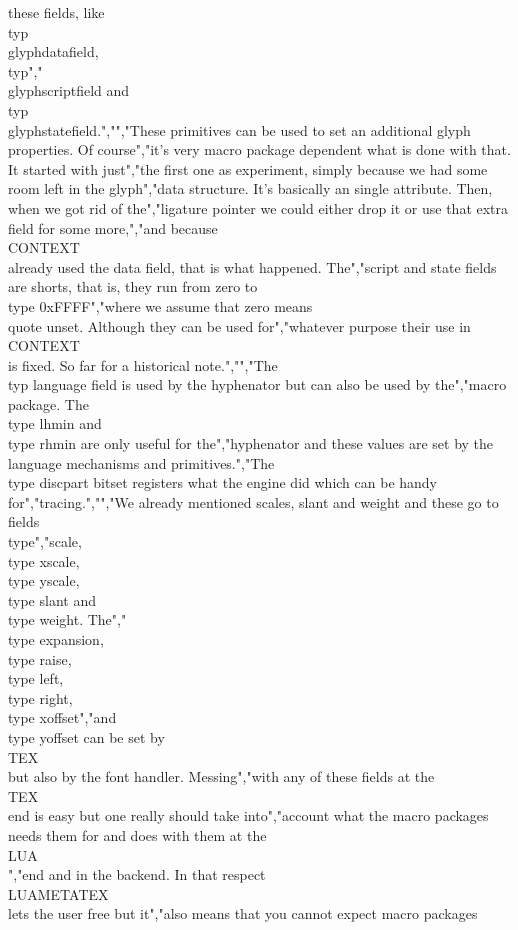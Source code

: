 these fields, like \\typ {\\glyphdatafield}, \\typ","{\\glyphscriptfield} and \\typ {\\glyphstatefield}.","","These primitives can be used to set an additional glyph properties. Of course","it's very macro package dependent what is done with that. It started with just","the first one as experiment, simply because we had some room left in the glyph","data structure. It's basically an single attribute. Then, when we got rid of the","ligature pointer we could either drop it or use that extra field for some more,","and because \\CONTEXT\\ already used the data field, that is what happened. The","script and state fields are shorts, that is, they run from zero to \\type {0xFFFF}","where we assume that zero means \\quote {unset}. Although they can be used for","whatever purpose their use in \\CONTEXT\\ is fixed. So far for a historical note.","","The \\typ {language} field is used by the hyphenator but can also be used by the","macro package. The \\type {lhmin} and \\type {rhmin} are only useful for the","hyphenator and these values are set by the language mechanisms and primitives.","The \\type {discpart} bitset registers what the engine did which can be handy for","tracing.","","We already mentioned scales, slant and weight and these go to fields \\type","{scale}, \\type {xscale}, \\type {yscale}, \\type {slant} and \\type {weight}. The","\\type {expansion}, \\type {raise}, \\type {left}, \\type {right}, \\type {xoffset}","and \\type {yoffset} can be set by \\TEX\\ but also by the font handler. Messing","with any of these fields at the \\TEX\\ end is easy but one really should take into","account what the macro packages needs them for and does with them at the \\LUA\\","end and in the backend. In that respect \\LUAMETATEX\\ lets the user free but it","also means that you cannot expect macro packages 